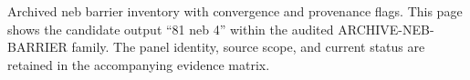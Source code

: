 Archived neb barrier inventory with convergence and provenance flags. This page shows the candidate output ``81 neb 4'' within the audited ARCHIVE-NEB-BARRIER family. The panel identity, source scope, and current status are retained in the accompanying evidence matrix.
